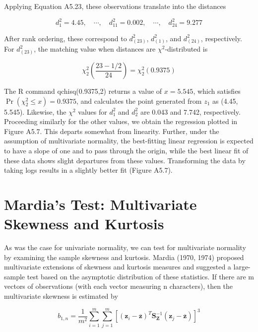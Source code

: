 \documentclass{article}
\begin{document}
Applying Equation A5.23, these observations translate into the distances

\begin{equation}
d_{1}^{2}=4.45,\quad\cdots,\quad d_{11}^{2}=0.002,\quad\cdots,\quad d_{24}^{2}=9.277
\end{equation}

After rank ordering, these correspond to  $ d_{(23)}^{2} $,  $ d_{(1)}^{2} $, and  $ d_{(24)}^{2} $, respectively. For  $ d_{(23)}^{2} $, the matching value when distances are  $ \chi^{2} $-distributed is

\begin{equation}
\chi_{2}^{2}\left(\frac{23-1/2}{24}\right)=\chi_{2}^{2}\left(0.9375\right)
\end{equation}

The R command qchisq(0.9375,2) returns a value of  $ x = 5.545 $, which satisfies  $ \Pr(\chi_2^2 \leq x) = 0.9375 $, and calculates the point generated from  $ z_1 $ as (4.45, 5.545). Likewise, the  $ \chi^2 $ values for  $ d_1^2 $ and  $ d_2^2 $ are 0.043 and 7.742, respectively. Proceeding similarly for the other values, we obtain the regression plotted in Figure A5.7. This departs somewhat from linearity. Further, under the assumption of multivariate normality, the best-fitting linear regression is expected to have a slope of one and to pass through the origin, while the best linear fit of these data shows slight departures from these values. Transforming the data by taking logs results in a slightly better fit (Figure A5.7).

\section{Mardia's Test: Multivariate Skewness and Kurtosis}
As was the case for univariate normality, we can test for multivariate normality by examining the sample skewness and kurtosis. Mardia (1970, 1974) proposed multivariate extensions of skewness and kurtosis measures and suggested a large-sample test based on the asymptotic distribution of these statistics. If there are m vectors of observations (with each vector measuring n characters), then the multivariate skewness is estimated by

\begin{equation}
b_{1,n}=\frac{1}{m^{2}}\sum_{i=1}^{m}\sum_{j=1}^{m}\left[\left(\mathbf{z}_{i}-\overline{\mathbf{z}}\right)^{T}\mathbf{S}_{\mathbf{Z}}^{-1}\left(\mathbf{z}_{j}-\overline{\mathbf{z}}\right)\right]^{3}
\end{equation}
\end{document}
